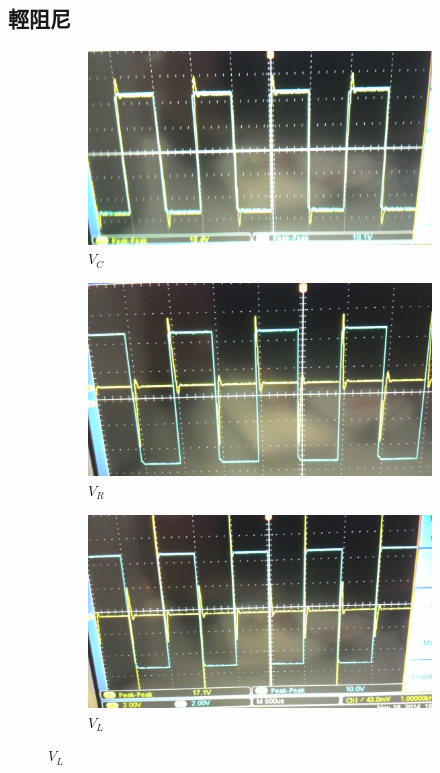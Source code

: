 \documentclass[12pt, a4paper]{article}
\begin{document}
\subsection{輕阻尼}
\begin{figure}[H]
  \centering
  \begin{subfigure}[b]{0.6\textwidth}
    \includegraphics[width=1\textwidth]{data/pic/P_20141118_190608.jpg}
    \caption{$V_C$}
  \end{subfigure}
  \begin{subfigure}[b]{0.6\textwidth}
    \includegraphics[width=1\textwidth]{data/pic/P_20141118_190528.jpg}
    \caption{$V_R$}
  \end{subfigure}
  \begin{subfigure}[b]{0.6\textwidth}
    \includegraphics[width=1\textwidth]{data/pic/P_20141118_190803.jpg}
    \caption{$V_L$}
  \end{subfigure}
\end{figure}
\end{document}
